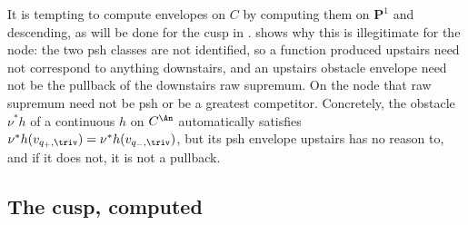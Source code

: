 \begin{remark}
\label{rem:ch45-node-trap}
It is tempting to compute envelopes on $C$ by computing them on
$\mathbf P^1$ and descending, as will be done for the cusp in
.   shows why
this is illegitimate for the node: the two psh classes are not identified,
so a function produced upstairs need not correspond to anything downstairs,
and an upstairs obstacle envelope need not be the pullback of the
downstairs raw supremum.  On the node that raw supremum need not be psh
or be a greatest competitor.  Concretely, the obstacle $\nu^*h$ of a continuous $h$ on
$C^{\An}$ automatically satisfies $\nu^*h(v_{q_+,\triv})
=\nu^*h(v_{q_-,\triv})$, but its psh envelope upstairs has no reason to,
and if it does not, it is not a pullback.
\end{remark}

\subsection{The cusp, computed}
\label{sec:ch45-cusp}

